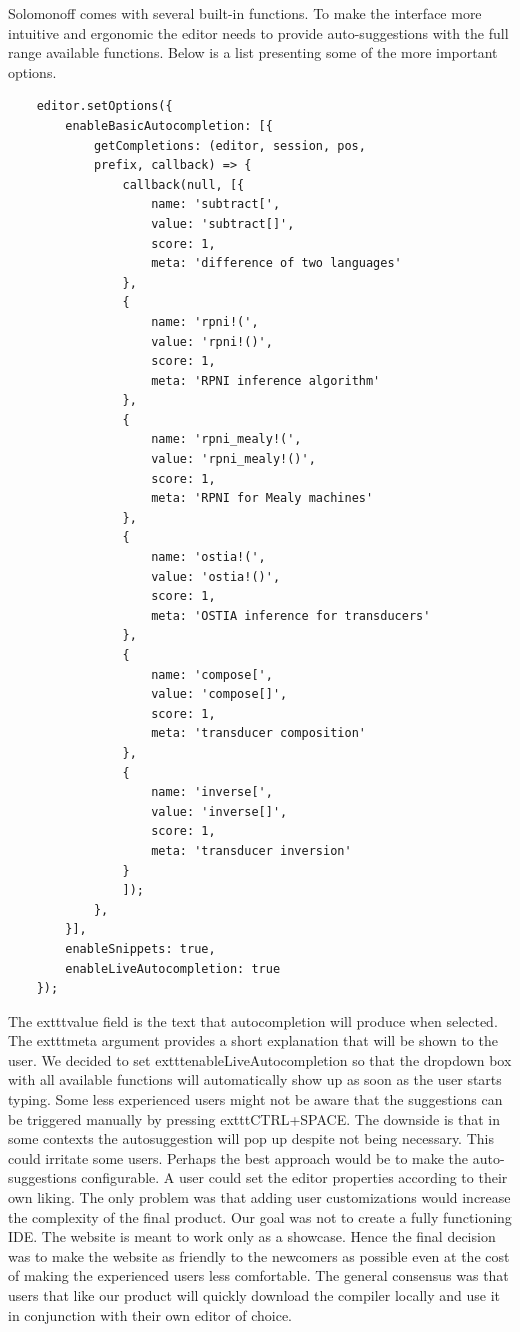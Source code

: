 Solomonoff comes with several built-in functions. To make the interface more intuitive and ergonomic the editor needs to provide auto-suggestions with the full range available functions. Below is a list presenting some of the more important options.
\begin{lstlisting}
	editor.setOptions({
		enableBasicAutocompletion: [{
			getCompletions: (editor, session, pos,
			prefix, callback) => {
				callback(null, [{
					name: 'subtract[',
					value: 'subtract[]',
					score: 1,
					meta: 'difference of two languages'
				},
				{
					name: 'rpni!(',
					value: 'rpni!()',
					score: 1,
					meta: 'RPNI inference algorithm'
				},
				{
					name: 'rpni_mealy!(',
					value: 'rpni_mealy!()',
					score: 1,
					meta: 'RPNI for Mealy machines'
				},
				{
					name: 'ostia!(',
					value: 'ostia!()',
					score: 1,
					meta: 'OSTIA inference for transducers'
				},
				{
					name: 'compose[',
					value: 'compose[]',
					score: 1,
					meta: 'transducer composition'
				},
				{
					name: 'inverse[',
					value: 'inverse[]',
					score: 1,
					meta: 'transducer inversion'
				}
				]);
			},
		}],
		enableSnippets: true,
		enableLiveAutocompletion: true
	});
\end{lstlisting}
The     exttt{value} field is the text that autocompletion will produce when selected. The     exttt{meta} argument provides a short explanation that will be shown to the user. We decided to set     exttt{enableLiveAutocompletion} so that the dropdown box with all available functions will automatically show up as soon as the user starts typing. Some less experienced users might not be aware that the suggestions can be triggered manually by pressing     exttt{CTRL+SPACE}. The downside is that in some contexts the autosuggestion will pop up  despite not being necessary. This could irritate some users. Perhaps the best approach would be to make the auto-suggestions configurable. A user could set the editor properties according to their own liking. The only problem was that adding user customizations would increase the complexity of the final product. Our goal was not to create a fully functioning IDE. The website is meant to work only as a showcase. Hence the final decision was to make the website as friendly to the newcomers as possible even at the cost of making the experienced users less comfortable. The general consensus was that users that like our product will quickly download the compiler locally and use it in conjunction with their own editor of choice. 

